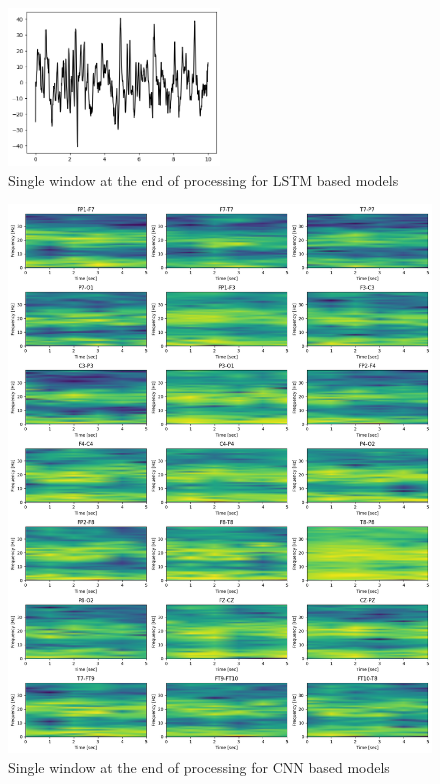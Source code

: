 \begin{figure}[ht]
    \centering
    \includegraphics[width=0.5\textwidth]{images/Experimental-validation/lstm-processed-edf.png}
    \caption{Single window at the end of processing for LSTM based models}
    \label{fig:lstm-processed-edf}
\end{figure}

\begin{figure}[ht]
    \centering
    \includegraphics[width=1.0\textwidth]{images/Experimental-validation/spectrogram-processed-edf.png}
    \caption{Single window at the end of processing for CNN based models}
    \label{fig:spectrogram-processed-edf}
\end{figure}

